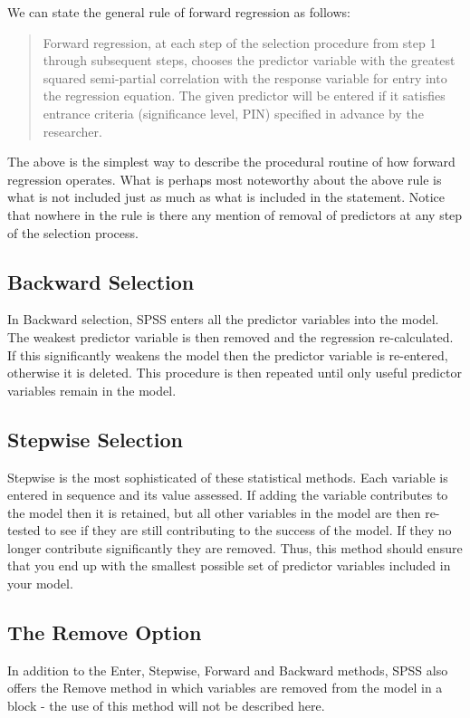 \documentclass[a4paper,12pt]{article}
\begin{document}
We can state the general rule of forward regression as follows:
\begin{quote}
	Forward regression, at each step of the selection procedure from step 1 through subsequent steps, chooses the predictor variable with the greatest squared semi-partial correlation with the response variable for entry into the regression equation. The given predictor will be entered if it satisfies entrance criteria (significance level, PIN) specified in advance by the researcher.
\end{quote}

The above is the simplest way to describe the procedural routine of how forward regression operates. What is perhaps most noteworthy about the above rule is what is not included just as much as what is included in the statement. Notice that nowhere in the rule is there any mention of removal of predictors at any step of the selection process. 

\subsection{Backward Selection}
In Backward selection, SPSS enters all the predictor variables into the model. The weakest predictor variable is then removed and the regression re-calculated. If this significantly weakens the model then the predictor variable is re-entered, otherwise it is deleted. This procedure is then repeated until only useful predictor variables remain in the model.

\subsection{Stepwise Selection}
Stepwise is the most sophisticated of these statistical methods. Each variable is entered in sequence and its value assessed. If adding the variable contributes to the model then it is retained, but all other variables in the model are then re-tested to see if they are still contributing to the success of the model. If they no longer contribute significantly they are removed. Thus, this method should ensure that you end up with the smallest possible set of predictor variables included in your model.

\subsection{The Remove Option}
In addition to the Enter, Stepwise, Forward and Backward methods, SPSS also offers the Remove method in which variables are removed from the model in a block - the use of this method will not be described here.
\end{document}
